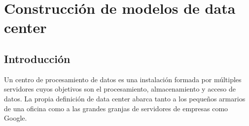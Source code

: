 



\section{Construcción de modelos de data center}

\subsection{Introducción}
Un centro de procesamiento de datos es una instalación formada por múltiples servidores cuyos objetivos son el procesamiento, almacenamiento y acceso de datos. La propia definición de data center abarca tanto a los pequeños armarios de una oficina  como a las grandes granjas de servidores de empresas como Google. 

